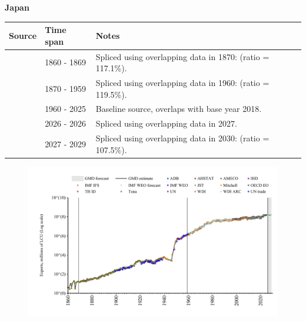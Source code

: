 \documentclass[12pt,a4paper,landscape]{article}
\begin{document}
\begin{adjustbox}{max totalsize={\paperwidth}{\paperheight},center}
\begin{minipage}[t][\textheight][t]{\textwidth}
\vspace*{0.5cm}
{}
\begin{center}
{\Large\bfseries Japan}
\end{center}
\vspace{0.5cm}
\begin{table}[H]
\centering
\small
\begin{tabular}{|l|l|l|}
\hline
\textbf{Source} & \textbf{Time span} & \textbf{Notes} \\
\hline
\rowcolor{white}\cite{Tena}& 1860 - 1869 &Spliced using overlapping data in 1870: (ratio = 117.1\%).\\
\rowcolor{lightgray}\cite{JST}& 1870 - 1959 &Spliced using overlapping data in 1960: (ratio = 119.5\%).\\
\rowcolor{white}\cite{OECD_EO}& 1960 - 2025 &Baseline source, overlaps with base year 2018.\\
\rowcolor{lightgray}\cite{AMECO}& 2026 - 2026 &Spliced using overlapping data in 2027.\\
\rowcolor{white}\cite{IMF_WEO_forecast}& 2027 - 2029 &Spliced using overlapping data in 2030: (ratio = 107.5\%).\\
\hline
\end{tabular}
\end{table}
\begin{figure}[H]
\centering
\includegraphics[width=\textwidth,height=0.6\textheight,keepaspectratio]{graphs/JPN_exports.pdf}
\end{figure}
\end{minipage}
\end{adjustbox}
\end{document}
